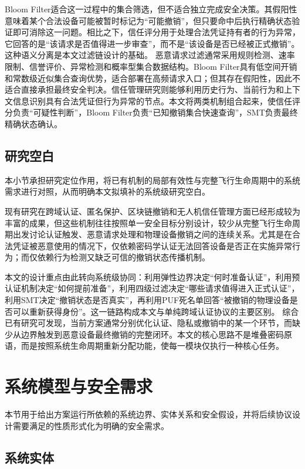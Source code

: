 \documentclass[conference]{IEEEtran}
\begin{document}
	Bloom Filter适合这一过程中的集合筛选，但不适合独立完成安全决策。其假阳性意味着某个合法设备可能被暂时标记为“可能撤销”，但只要命中后执行精确状态验证即可消除这一问题。相比之下，信任评分用于处理合法凭证持有者的行为异常，它回答的是“该请求是否值得进一步审查”，而不是“该设备是否已经被正式撤销”。这种语义分离是本文过滤链设计的基础。
	恶意请求过滤通常采用规则检测、速率限制、信誉评价、异常检测和概率型集合数据结构。Bloom Filter具有低空间开销和常数级近似集合查询优势，适合部署在高频请求入口；但其存在假阳性，因此不适合直接承担最终安全判决。信任管理研究则能够利用历史行为、当前行为和上下文信息识别具有合法凭证但行为异常的节点。本文将两类机制组合起来，使信任评分负责“可疑性判断”，Bloom Filter负责“已知撤销集合快速查询”，SMT负责最终精确状态确认。
	
	\subsection{研究空白}
	
	本小节承担研究定位作用，将已有机制的局部有效性与完整飞行生命周期中的系统需求进行对照，从而明确本文拟填补的系统级研究空白。
	
	现有研究在跨域认证、匿名保护、区块链撤销和无人机信任管理方面已经形成较为丰富的成果，但这些机制往往按照单一安全目标分别设计，较少从完整飞行生命周期出发讨论认证触发、恶意请求处理和物理设备撤销之间的连续关系。尤其是在合法凭证被恶意使用的情况下，仅依赖密码学认证无法回答设备是否正在实施异常行为；而仅依赖行为检测又缺乏可信的撤销状态传播机制。
	
	本文的设计重点由此转向系统级协同：利用弹性边界决定“何时准备认证”，利用预认证机制决定“如何提前准备”，利用四级过滤决定“哪些请求值得进入正式认证”，利用SMT决定“撤销状态是否真实”，再利用PUF死名单回答“被撤销的物理设备是否可以重新获得身份”。这一链路构成本文与单纯跨域认证协议的主要区别。
	综合已有研究可发现，当前方案通常分别优化认证、隐私或撤销中的某一个环节，而缺少从边界触发到恶意设备最终撤销的完整闭环。本文的核心思路不是堆叠密码原语，而是按照系统生命周期重新分配功能，使每一模块仅执行一种核心任务。
	
	\section{系统模型与安全需求}
	
	本节用于给出方案运行所依赖的系统边界、实体关系和安全假设，并将后续协议设计需要满足的性质形式化为明确的安全需求。
	
	
	\subsection{系统实体}
	
\end{document}
